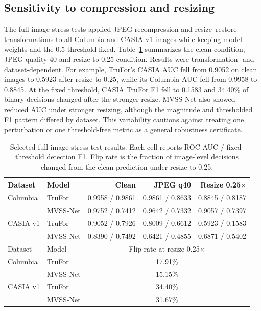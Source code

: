 \subsection{Sensitivity to compression and resizing}
The full-image stress tests applied JPEG recompression and resize--restore transformations to all Columbia and CASIA v1 images while keeping model weights and the 0.5 threshold fixed. Table~\ref{tab:stress} summarizes the clean condition, JPEG quality 40 and resize-to-0.25 condition. Results were transformation- and dataset-dependent. For example, TruFor's CASIA AUC fell from 0.9052 on clean images to 0.5923 after resize-to-0.25, while its Columbia AUC fell from 0.9958 to 0.8845. At the fixed threshold, CASIA TruFor F1 fell to 0.1583 and 34.40\% of binary decisions changed after the stronger resize. MVSS-Net also showed reduced AUC under stronger resizing, although the magnitude and thresholded F1 pattern differed by dataset. This variability cautions against treating one perturbation or one threshold-free metric as a general robustness certificate.

\begin{table}[t]
\centering
\caption{Selected full-image stress-test results. Each cell reports ROC-AUC / fixed-threshold detection F1. Flip rate is the fraction of image-level decisions changed from the clean prediction under resize-to-0.25.}
\label{tab:stress}
\small
\begin{tabular}{llrrr}
\toprule
Dataset & Model & Clean & JPEG q40 & Resize 0.25$\times$ \\
\midrule
Columbia & TruFor & 0.9958 / 0.9861 & 0.9861 / 0.8633 & 0.8845 / 0.8187 \\
 & MVSS-Net & 0.9752 / 0.7412 & 0.9642 / 0.7332 & 0.9057 / 0.7397 \\
CASIA v1 & TruFor & 0.9052 / 0.7926 & 0.8009 / 0.6612 & 0.5923 / 0.1583 \\
 & MVSS-Net & 0.8390 / 0.7492 & 0.6421 / 0.4855 & 0.6871 / 0.5402 \\
\midrule
Dataset & Model & \multicolumn{3}{c}{Flip rate at resize 0.25$\times$} \\
\midrule
Columbia & TruFor & \multicolumn{3}{c}{17.91\%} \\
 & MVSS-Net & \multicolumn{3}{c}{15.15\%} \\
CASIA v1 & TruFor & \multicolumn{3}{c}{34.40\%} \\
 & MVSS-Net & \multicolumn{3}{c}{31.67\%} \\
\bottomrule
\end{tabular}
\end{table}

